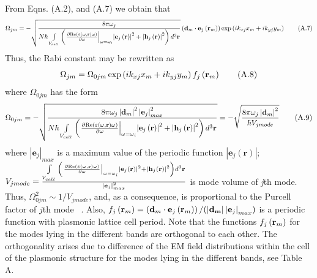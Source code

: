 \documentclass[aps,pra,amsmath,amssymb,onecolumn,superscriptaddress,showpacs,floatfix,]{revtex4-1}
\begin{document}
From Eqns. (A.2), and (A.7) we obtain that
\begin{equation}
{\Omega _{jm}} =-\sqrt{\frac{{8\pi \omega _j}}{{N \hbar} \int\limits_{{V_{cell}}} {\left( {{{\left. {\frac{{\partial {\mathop{\rm Re}\nolimits} \left( {\varepsilon(\omega, \textbf{r}) \omega } \right)}}{{\partial \omega }}} \right|}_{\omega  = {\omega _i}}}{{\left| {{{\bf{e}}_j}\left( {\bf{r}} \right)} \right|}^2} + {{\left| {{{\bf{h}}_j}\left( {\bf{r}} \right)} \right|}^2}} \right){d^3}{\bf{r}}}}} \left( {{{\bf{d}}_m} \cdot {{\bf{e}}_j}\left( {{{\bf{r}}_m}} \right)} \right)\exp \left( {i{k_{xj}}{x_m} + i{k_{yj}}{y_m}} \right) \tag{A.7}
\end{equation}
Thus, the Rabi constant may be rewritten as
\begin{equation}
{\Omega _{jm}} = {\Omega _{0jm}}\exp \left( {i{k_{xj}}{x_m} + i{k_{yj}}{y_m}} \right){f_j}\left( {{{\bf{r}}_m}} \right) \tag{A.8}
\end{equation}
where $\Omega _{0jm}$ has the form
\begin{equation}
{\Omega _{0jm}} =-\sqrt{\frac{{8\pi \omega _j \left|\textbf{d}_m\right|^2 \left|\textbf{e}_{j}\right|_{max}^2}}{{N \hbar} \int\limits_{{V_{cell}}} {\left( {{{\left. {\frac{{\partial {\mathop{\rm Re}\nolimits} \left( {\varepsilon(\omega, \textbf{r}) \omega } \right)}}{{\partial \omega }}} \right|}_{\omega  = {\omega _i}}}{{\left| {{{\bf{e}}_j}\left( {\bf{r}} \right)} \right|}^2} + {{\left| {{{\bf{h}}_j}\left( {\bf{r}} \right)} \right|}^2}} \right){d^3}{\bf{r}}}}} = -\sqrt{\frac{{8\pi \omega _j \left|\textbf{d}_m\right|^2}}{\hbar V_{j mode}}} \tag{A.9}
\end{equation}
where $\left|\textbf{e}_{j}\right|_{max}$ is a maximum value of the periodic function $\left|\textbf{e}_{j}(\textbf{r})\right|$; $V_{j mode}=\frac{\int\limits_{{V_{cell}}} {\left( {{{\left. {\frac{{\partial {\mathop{\rm Re}\nolimits} \left( {\varepsilon(\omega, \textbf{r}) \omega } \right)}}{{\partial \omega }}} \right|}_{\omega  = {\omega _i}}}{{\left| {{{\bf{e}}_j}\left( {\bf{r}} \right)} \right|}^2} + {{\left| {{{\bf{h}}_j}\left( {\bf{r}} \right)} \right|}^2}} \right){d^3}{\bf{r}}}}{\left|\textbf{e}_{j}\right|_{max}^2}$ is mode volume of \textit{j}th mode. Thus, $\Omega_{0jm}^2 \sim 1/V_{jmode}$, and, as a consequence, is proportional to the Purcell factor of $j$th mode ~\cite{ZhouNatNano}.
Also, ${f_j}\left( {{{\bf{r}}_m}} \right) = \left( {{{\bf{d}}_m} \cdot {{\bf{e}}_j}\left( {{{\bf{r}}_m}} \right)} \right)/(\left|\bf{d}_m\right| \left|\textbf{e}_{j}\right|_{max})$ is a periodic function with plasmonic lattice cell period. Note that the functions ${f_j}\left( {{{\bf{r}}_m}} \right)$ for the modes lying in the different bands are orthogonal to each other. The orthogonality arises due to difference of the EM field distributions within the cell of the plasmonic structure for the modes lying in the different bands, see Table A.


\end{document}
